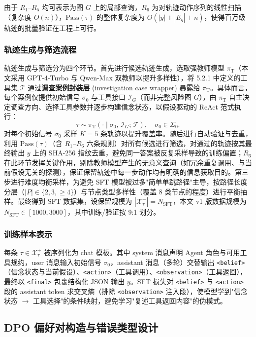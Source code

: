 \documentclass[a4paper,12pt]{ctexart}
\begin{document}
由于 $R_1$–$R_5$ 均可表示为图 $G$ 上的局部查询，$R_6$ 为对轨迹动作序列的线性扫描（复杂度 $O(n)$），$\mathrm{Pass}(\tau)$ 的整体复杂度为 $O(|y|+|E_q|+n)$，使得百万级轨迹的批量验证在工程上可行。

\subsubsection{轨迹生成与筛选流程}

轨迹生成与筛选分为四个环节。首先进行候选轨迹生成，选取强教师模型 $\pi_\mathrm{T}$（本文采用 GPT-4-Turbo 与 Qwen-Max 双教师以提升多样性），将 5.2.1 中定义的工具集 $\mathcal{T}$ 通过\textbf{调查案例封装层} (investigation case wrapper) 暴露给 $\pi_\mathrm{T}$。具体而言，每个案例仅提供初始信号 $\sigma_0$ 与工具接口 $\mathcal{I}_G$（而非完整风险图 $G$），由 $\pi_\mathrm{T}$ 自主决定调查方向、选择工具参数并逐步构建信念状态，以假设驱动的 ReAct 范式执行：
\[\tau\sim \pi_\mathrm{T}(\cdot \mid \sigma_0,\, \mathcal{I}_G;\, \mathcal{T}),\quad \sigma_0\in \Sigma_0.\]
对每个初始信号 $\sigma_0$ 采样 $K=5$ 条轨迹以提升覆盖率。随后进行自动验证与去重，利用 $\mathrm{Pass}(\tau)$（含 $R_1$–$R_6$ 六条规则）对所有候选进行筛选，对通过的轨迹按其最终输出 $y$ 上的 SHA-256 指纹去重，避免同一答案被反复采样导致的训练偏置；$R_6$ 在此环节发挥关键作用，剔除教师模型产生的无意义查询（如冗余重复调用、与当前假设无关的探测），保证保留轨迹中每一步动作均有明确的信息获取目的。第三步进行难度均衡采样，为避免 SFT 模型被过多"简单单跳路径"主导，按路径长度分层（$|P|\in\{2,3,\geq 4\}$）与节点类型多样性（覆盖 8 类节点的程度）进行平衡抽样。最终得到 SFT 数据集，设保留规模为 $|\mathcal{X}_\tau^+|=N_{\mathrm{SFT}}$，本文 v1 版数据规模为 $N_{\mathrm{SFT}}\in[1000,3000]$，其中训练/验证按 9:1 划分。

\subsubsection{训练样本表示}

每条 $\tau\in\mathcal{X}_\tau^+$ 被序列化为 chat 模板。其中 system 消息声明 Agent 角色与可用工具规约，user 消息输入初始信号 $\sigma_0$，assistant 消息（多轮）交替输出 \texttt{<belief>}（信念状态与当前假设）、\texttt{<action>}（工具调用）、\texttt{<observation>}（工具返回），最终以 \texttt{<final>} 包裹结构化 JSON 输出 $y$。SFT 损失对 \texttt{<belief>} 与 \texttt{<action>} 段的 assistant token 求交叉熵（排除 \texttt{<observation>} 注入段），使模型学到"信念状态 $\to$ 工具选择"的条件映射，避免学习"复述工具返回内容"的伪模式。

\subsection{DPO 偏好对构造与错误类型设计}
\end{document}
